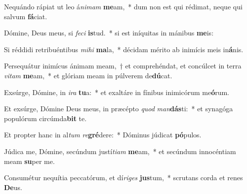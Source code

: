 \item Nequándo rápiat ut leo á\textit{ni}\textit{mam} \textbf{me}am,~* dum non est qui rédimat, neque qui salvum \textbf{fá}ciat.
\item Dómine, Deus meus, si \textit{fe}\textit{ci} \textbf{is}tud.~* si est iníquitas in mánibus \textbf{me}is:
\item Si réddidi retribuéntibus \textit{mi}\textit{hi} \textbf{ma}la,~* décidam mérito ab inimícis meis in\textbf{á}nis.
\item Persequátur inimícus ánimam meam,~† et comprehéndat, et concúlcet in terra \textit{vi}\textit{tam} \textbf{me}am,~* et glóriam meam in púlverem de\textbf{dú}cat.
\item Exsúrge, Dómine, in \textit{i}\textit{ra} \textbf{tu}a:~* et exaltáre in fínibus inimicórum me\textbf{ó}rum.
\item Et exsúrge, Dómine Deus meus, in præcépto \textit{quod} \textit{man}\textbf{dás}ti:~* et synagóga populórum circúmda\textbf{bit} te.
\item Et propter hanc in al\textit{tum} \textit{re}\textbf{gré}dere:~* Dóminus júdicat \textbf{pó}pulos.
\item Júdica me, Dómine, secúndum justí\textit{ti}\textit{am} \textbf{me}am,~* et secúndum innocéntiam meam \textbf{su}per me.
\item Consumétur nequítia peccatórum, et dí\textit{ri}\textit{ges} \textbf{jus}tum,~* scrutans corda et renes \textbf{De}us.
